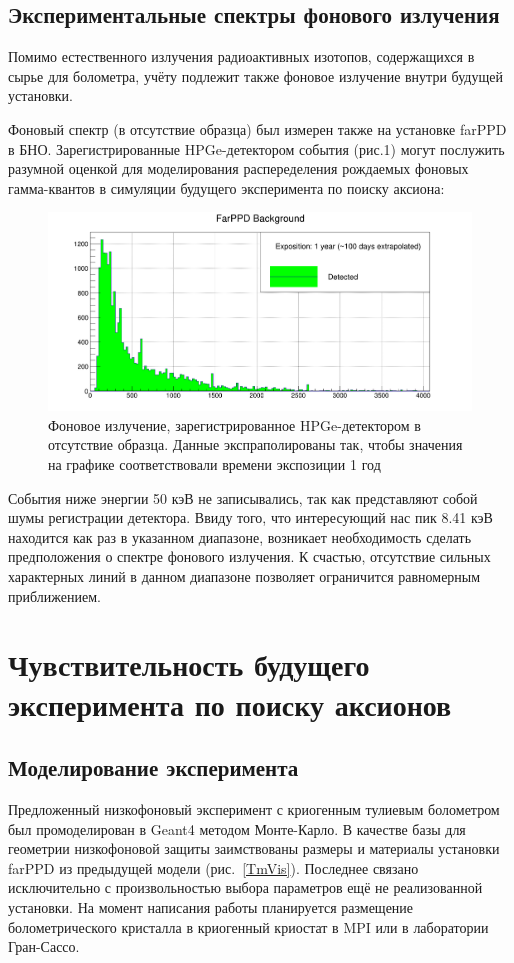 \documentclass[a4paper,article,14pt]{extarticle}
\begin{document}
\subsection{Экспериментальные спектры фонового излучения}
Помимо естественного излучения радиоактивных изотопов, содержащихся в сырье для болометра, учёту подлежит также фоновое излучение внутри будущей установки.

Фоновый спектр (в отсутствие образца) был измерен также на установке farPPD в БНО. Зарегистрированные HPGe-детектором события (рис.1) могут послужить разумной оценкой для моделирования распеределения рождаемых фоновых гамма-квантов в симуляции будущего эксперимента по поиску аксиона:

\begin{figure}[h]
    \centering
    \includegraphics[width = \textwidth]{images/FarPPD_background.png}
    \caption{Фоновое излучение, зарегистрированное HPGe-детектором в отсутствие образца. Данные экспраполированы так, чтобы значения на графике соответствовали времени экспозиции 1 год}
    \label{fon}
\end{figure}

События ниже энергии 50 кэВ не записывались, так как представляют собой шумы регистрации детектора. Ввиду того, что интересующий нас пик 8.41 кэВ находится как раз в указанном диапазоне, возникает необходимость сделать предположения о спектре фонового излучения. К счастью, отсутствие сильных характерных линий в данном диапазоне позволяет ограничится равномерным приближением.

\newpage
\section{Чувствительность будущего эксперимента по поиску аксионов}

\subsection{Моделирование эксперимента}
Предложенный низкофоновый эксперимент с криогенным тулиевым болометром был промоделирован в Geant4 методом Монте-Карло.
В качестве базы для геометрии низкофоновой защиты заимствованы размеры и материалы установки farPPD из предыдущей модели (рис.~\ref{TmVis}).
Последнее связано исключительно с произвольностью выбора параметров ещё не реализованной установки.
На момент написания работы планируется размещение болометрического кристалла в криогенный криостат в MPI или в лаборатории Гран-Сассо.
\end{document}
